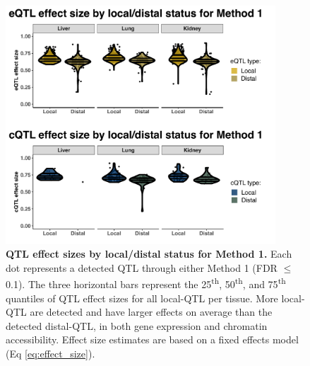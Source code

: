 \documentclass[9pt,twocolumn,twoside]{gsajnl}
\begin{document}
\begin{figure}[h]
\centering
\includegraphics[width=0.9\textwidth, trim={0in 0in 0in 0in}, clip]{figs/qtl_effect_sizes_strict.pdf}
\caption{\textbf{QTL effect sizes by local/distal status for Method 1.} Each dot represents a detected QTL through either Method 1 (FDR $\leq$ 0.1). The three horizontal bars represent the 25\textsuperscript{th}, 50\textsuperscript{th}, and 75\textsuperscript{th} quantiles of QTL effect sizes for all local-QTL per tissue. More local-QTL are detected and have larger effects on average than the detected distal-QTL, in both gene expression and chromatin accessibility. Effect size estimates are based on a fixed effects model (Eq \ref{eq:effect_size}).
\label{fig:qtl_effect_sizes_strict}}
\end{figure}
\end{document}
